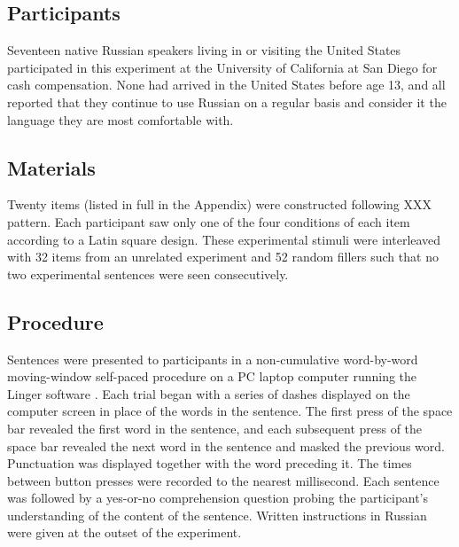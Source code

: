 \documentclass[12pt]{article}
\begin{document}
\subsection{Participants}
\label{sec:participants}

Seventeen native Russian speakers living in or visiting the United
States participated in this experiment at the University of California
at San Diego for cash compensation.  None had arrived in the United
States before age 13, and all reported that they continue to use
Russian on a regular basis and consider it the language they are most
comfortable with.

\subsection{Materials}
\label{sec:materials}


Twenty items (listed in full in the Appendix) were constructed following XXX
pattern.  Each participant saw only one of the four conditions of each
item according to a Latin square design.  These experimental stimuli
were interleaved with 32 items from an unrelated experiment and 52
random fillers such that no two experimental sentences were seen
consecutively.



\subsection{Procedure}
\label{sec:procedure}


Sentences were presented to participants in a non-cumulative
word-by-word moving-window self-paced procedure on a PC laptop
computer running the Linger software \citep{rohde:lingermanual}. Each
trial began with a series of dashes displayed on the computer screen
in place of the words in the sentence. The first press of the space
bar revealed the first word in the sentence, and each subsequent press
of the space bar revealed the next word in the sentence and masked the
previous word. Punctuation was displayed together with the word
preceding it.  The times between button presses were recorded to the
nearest millisecond.  Each sentence was followed by a yes-or-no
comprehension question probing the participant's understanding of the
content of the sentence.  Written instructions in Russian were given
at the outset of the experiment.
\end{document}
